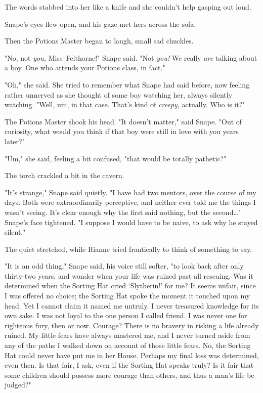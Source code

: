 The words stabbed into her like a knife and she couldn't help gasping out loud.

Snape's eyes flew open, and his gaze met hers across the sofa.

Then the Potions Master began to laugh, small sad chuckles.

"No, not \emph{you,} Miss~Felthorne!" Snape said. "Not \emph{you!} We really
\emph{are} talking about a boy. One who attends your Potions class, in fact."

"Oh," she said. She tried to remember what Snape had said before, now feeling
rather unnerved as she thought of some boy watching her, always silently
watching. "Well, um, in that case. That's kind of \emph{creepy}, actually. Who
is it?"

The Potions Master shook his head. "It doesn't matter," said Snape. "Out of
curiosity, what would you think if that boy were still in love with you years
later?"

"Um," she said, feeling a bit confused, "that would be totally pathetic?"

The torch crackled a bit in the cavern.

"It's strange," Snape said quietly. "I have had two mentors, over the course of
my days. Both were extraordinarily perceptive, and neither ever told me the
things I wasn't seeing. It's clear enough why the first said nothing, but the
second{\ldots}" Snape's face tightened. "I suppose I would have to be naive, to
ask why he stayed silent."

The quiet stretched, while Rianne tried frantically to think of something to
say.

"It is an odd thing," Snape said, his voice still softer, "to look back after
only thirty-two years, and wonder when your life was ruined past all rescuing.
Was it determined when the Sorting Hat cried `Slytherin!' for me? It seems
unfair, since I was offered no choice; the Sorting Hat spoke the moment it
touched upon my head. Yet I cannot claim it named me untruly. I never treasured
knowledge for its own sake. I was not loyal to the one person I called friend.
I was never one for righteous fury, then or now. Courage? There is no bravery
in risking a life already ruined. My little fears have always mastered me, and
I never turned aside from any of the paths I walked down on account of those little
fears. No, the Sorting Hat could never have put me in her House. Perhaps my
final loss was determined, even then. Is that fair, I ask, even if the Sorting
Hat speaks truly? Is it fair that some children should possess more courage
than others, and thus a man's life be judged?"

